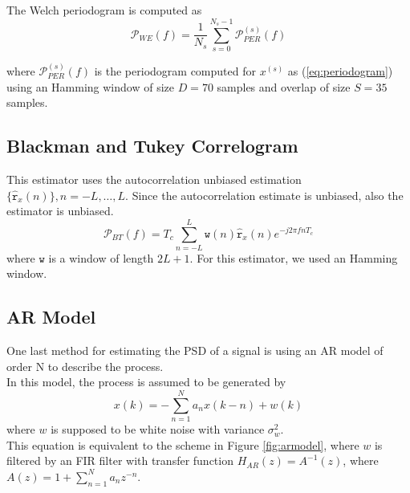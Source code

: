 \documentclass[a4paper, 12pt]{report}
\begin{document}
The Welch periodogram is computed as
\begin{equation}
\mathcal{P}_{WE}(f) = \frac{1}{N_s}\sum_{s=0}^{N_s-1}{\mathcal{P}}_{PER}^{(s)}(f)
\end{equation}

where ${\mathcal{P}}_{PER}^{(s)}(f)$ is the periodogram computed for $x^{(s)}$ as (\ref{eq:periodogram}) using an Hamming window of size $D=70$ samples and overlap of size $S=35$ samples.

\subsection*{Blackman and Tukey Correlogram}
This estimator uses the autocorrelation unbiased estimation $\{{\hat{\mathtt{r}}_x(n)}\}, n = -L,\dots, L$. Since the autocorrelation estimate is unbiased, also the estimator is unbiased.
\begin{equation}
\mathcal{P}_{BT}(f) = T_c\sum_{n=-L}^{L} \mathtt{w}(n)\hat{\mathtt{r}}_x(n)e^{-j2\pi f n T_c}
\end{equation}
where $\mathtt{w}$ is a window of length $2L+1$. For this estimator, we used an Hamming window.

\subsection*{AR Model}
One last method for estimating the PSD of a signal is using an AR model of order N to describe the process.\\
In this model, the process is assumed to be generated by
\begin{equation}
	x(k) = - \sum_{n=1}^N a_n x(k-n) + w(k)
\end{equation}
where $w$ is supposed to be white noise with variance $\sigma_w^2$.\\
This equation is equivalent to the scheme in Figure \ref{fig:armodel}, where $w$ is filtered by an FIR filter with transfer function $H_{AR}(z) = A^{-1}(z)$, where $A(z) = 1 + \sum_{n=1}^N a_n z^{-n}$.
\end{document}
